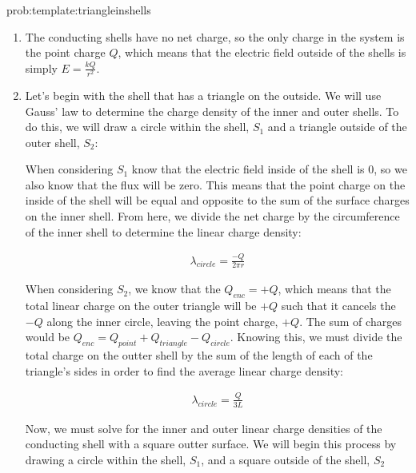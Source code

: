 \begin{solution}{prob:template:triangleinshells}\label{soln:template:triangleinshells}
	
	\begin{enumerate}
	
	\item The conducting shells have no net charge, so the only charge in the system is the point charge $Q$, which means that the electric field outside of the shells is simply $E = \frac{kQ}{r^2}$.
	
	\item Let's begin with the shell that has a triangle on the outside. We will use Gauss' law to determine the charge density of the inner and outer shells. To do this, we will draw a circle within the shell, $S_1$ and a triangle outside of the outer shell, $S_2$:
	
	
	
	 When considering $S_1$ know that the electric field inside of the shell is $0$, so we also know that the flux will be zero. This means that the point charge on the inside of the shell will be equal and opposite to the sum of the surface charges on the inner shell. From here, we divide the net charge by the circumference of the inner shell to determine the linear charge density:
	
	\begin{align*}
		\lambda_{circle} = \frac{-Q}{2\pi r}
	\end{align*}
		
	When considering $S_2$, we know that the $Q_{enc} = +Q$, which means that the total linear charge on the outer triangle will be $+Q$ such that it cancels the $-Q$ along the inner circle, leaving the point charge, $+Q$. The sum of charges would be $Q_{enc} = Q_{point}+Q_{triangle}-Q_{circle}$. Knowing this, we must divide the total charge on the outter shell by the sum of the length of each of the triangle's sides in order to find the average linear charge density:
	
	\begin{align*}
		\lambda_{circle} = \frac{Q}{3L}
	\end{align*}
	
	Now, we must solve for the inner and outer linear charge densities of the conducting shell with a square outter surface. We will begin this process by drawing a circle within the shell, $S_1$, and a square outside of the shell, $S_2$
	

\end{enumerate}
\end{solution}
